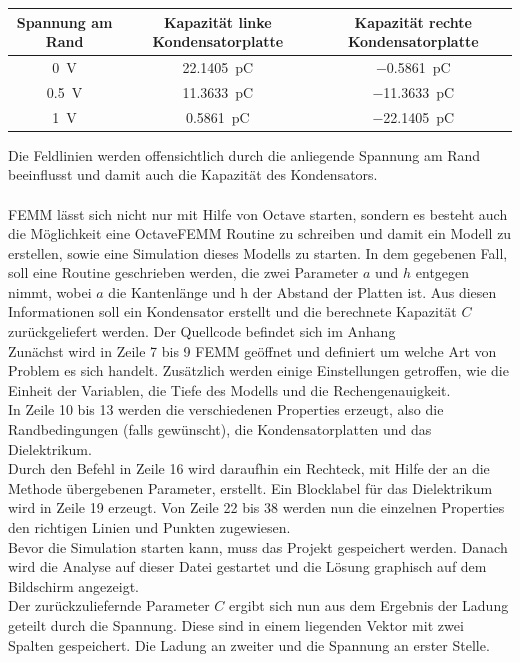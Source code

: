 \begin{table}[h]
	\centering
	\begin{tabular}[h]{c|c c}
		Spannung am Rand & Kapazität linke Kondensatorplatte & Kapazität rechte Kondensatorplatte \\
		\hline
		\SI{0}{\volt} &  \SI{22,1405}{\pico\coulomb} & \SI{-0,5861}{\pico\coulomb} \\
		\SI{0,5}{\volt} & \SI{11,3633}{\pico\coulomb} & \SI{-11,3633}{\pico\coulomb} \\
		\SI{1}{\volt} &  \SI{0,5861}{\pico\coulomb} & \SI{-22,1405}{\pico\coulomb}
	\end{tabular}
\end{table}
\vspace*{1.5cm}
Die Feldlinien werden offensichtlich durch die anliegende Spannung am Rand beeinflusst und damit auch die Kapazität des Kondensators.
\\
\\
FEMM lässt sich nicht nur mit Hilfe von Octave starten, sondern es besteht auch die Möglichkeit eine OctaveFEMM Routine zu schreiben und damit ein Modell zu erstellen, sowie eine Simulation dieses Modells zu starten. In dem gegebenen Fall, soll eine Routine geschrieben werden, die zwei Parameter $a$ und $h$ entgegen nimmt, wobei $a$ die Kantenlänge und h der Abstand der Platten ist. Aus diesen Informationen soll ein Kondensator erstellt und die berechnete Kapazität $C$ zurückgeliefert werden. Der Quellcode befindet sich im Anhang \\ 
\newpage
Zunächst wird in Zeile 7 bis 9 FEMM geöffnet und definiert um welche Art von Problem es sich handelt. Zusätzlich werden einige Einstellungen getroffen, wie die Einheit der Variablen, die Tiefe des Modells und die Rechengenauigkeit. \\ 
In Zeile 10 bis 13 werden die verschiedenen Properties erzeugt, also die Randbedingungen (falls gewünscht), die Kondensatorplatten und das Dielektrikum. \\
Durch den Befehl in Zeile 16 wird daraufhin ein Rechteck, mit Hilfe der an die Methode übergebenen Parameter,  erstellt. Ein Blocklabel für das Dielektrikum wird in Zeile 19 erzeugt. Von Zeile 22 bis 38 werden nun die einzelnen Properties den richtigen Linien und Punkten zugewiesen.\\
Bevor die Simulation starten kann, muss das Projekt gespeichert werden. Danach wird die Analyse auf dieser Datei gestartet und die Lösung graphisch auf dem Bildschirm angezeigt.\\
Der zurückzuliefernde Parameter $C$ ergibt sich nun aus dem Ergebnis der Ladung geteilt durch die Spannung. Diese sind in einem liegenden Vektor mit zwei Spalten gespeichert. Die Ladung an zweiter und die Spannung an erster Stelle. 